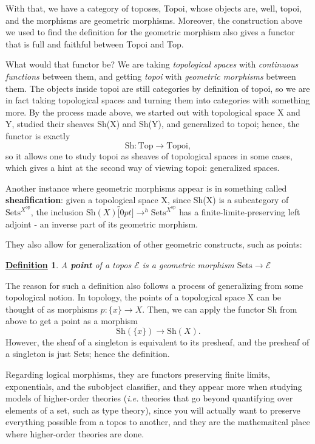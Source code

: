 \documentclass{article}
\newtheorem*{def*}{\underline{Definition}}
\begin{document}
With that, we have a category of toposes, Topoi, whose objects are, well, topoi, and the morphisms are geometric morphisms. Moreover, the construction above we used to find the definition for the geometric morphism also gives a functor that is full and faithful between Topoi and Top.

What would that functor be? We are taking \textit{topological spaces} with \textit{continuous functions} between them, and getting \textit{topoi} with \textit{geometric morphisms} between them. The objects inside topoi are still categories by definition of topoi, so we are in fact taking topological spaces and turning them into categories with something more. By the process made above, we started out with topological space X and Y, studied their sheaves Sh(X) and Sh(Y), and generalized to topoi; hence, the functor is exactly
\[
	\mathrm{Sh}:\mathrm{Top}\rightarrow \mathrm{Topoi},
\]
so it allows one to study topoi as sheaves of topological spaces in some cases, which gives a hint at the second way of viewing topoi: generalized spaces.

Another instance where geometric morphisms appear is in something called \textbf{sheafification}: given a topological space X, since Sh(X) is a subcategory of \(\mathrm{Sets}^{X^{\mathrm{op}}}\), the inclusion \(\mathrm{Sh}(X)\overbracket[0pt]{\rightarrow}^{h}\mathrm{Sets}^{X^{\mathrm{op}}}\) has a finite-limite-preserving left adjoint - an inverse part of its geometric morphism.

They also allow for generalization of other geometric constructs, such as points:

\begin{def*}
	A \textbf{point} of a topos \(\mathcal{E} \) is a geometric morphism \(\mathrm{Sets}\rightarrow \mathcal{E}\)
\end{def*}

The reason for such a definition also follows a process of generalizing from some topological notion. In topology, the points of a topological space X can be thought of as morphisms \(p:\{x\}\rightarrow X\). Then, we can apply the functor \(\mathrm{Sh}\) from above to get a point as a morphism
\[
	\mathrm{Sh}(\{x\})\rightarrow \mathrm{Sh}(X).
\]
However, the sheaf of a singleton is equivalent to its presheaf, and the presheaf of a singleton is just Sets; hence the definition.

Regarding logical morphisms, they are functors preserving finite limits, exponentials, and the subobject classifier, and they appear more when studying models of higher-order theories (\textit{i.e.} theories that go beyond quantifying over elements of a set, such as type theory), since you will actually want to preserve everything possible from a topos to another, and they are the mathemaitcal place where higher-order theories are done.
\end{document}
